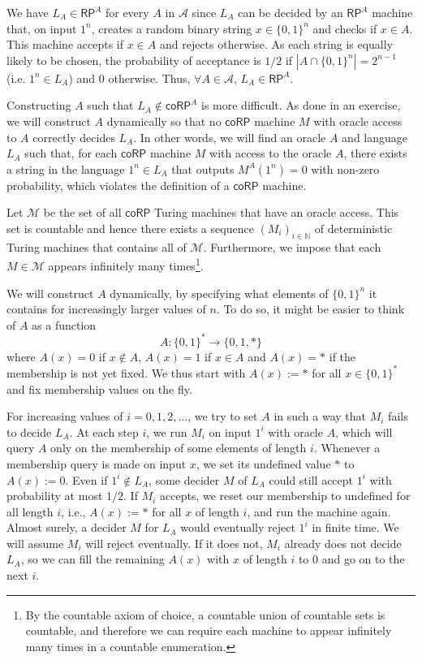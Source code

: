 \documentclass{article}
\begin{document}
We have $L_A \in \mathsf{RP}^A$ for every $A$ in $\mathcal{A}$ since $L_A$ can be decided by an $\mathsf{RP}^A$ machine that, on input $1^n$, creates a random binary string $x \in \{0, 1\}^n$ and checks if $x \in A$. This machine accepts if $x \in A$ and rejects otherwise. As each string is equally likely to be chosen, the probability of acceptance is $1/2$ if $|A \cap \{0, 1\}^n| = 2^{n-1}$ (i.e. $1^n \in L_A$) and $0$ otherwise.
Thus, $\forall A \in \mathcal{A}$, $L_A \in \mathsf{RP}^A$.

Constructing $A$ such that $L_A \notin \mathsf{coRP}^A$ is more difficult. As done in an exercise, we will construct $A$ dynamically so that no $\mathsf{coRP}$ machine $M$ with oracle access to $A$ correctly decides $L_A$. In other words, we will find an oracle $A$ and language $L_A$ such that, for each $\mathsf{coRP}$ machine $M$ with access to the oracle $A$, there exists a string in the language $1^n \in L_A$ that outputs $M^A(1^n) = 0$ with non-zero probability, which violates the definition of a $\mathsf{coRP}$ machine.

Let $\mathcal{M}$ be the set of all $\mathsf{coRP}$ Turing machines that have an oracle access. This set is countable and hence there exists a sequence $(M_i)_{i \in \mathbb{N}}$ of deterministic Turing machines that contains all of $\mathcal{M}$. Furthermore, we impose that each $M \in \mathcal{M}$ appears infinitely many times\footnote{By the countable axiom of choice, a countable union of countable sets is countable, and therefore we can require each machine to appear infinitely many times in a countable enumeration.}.

We will construct $A$ dynamically, by specifying what elements of $\{0, 1\}^n$ it contains for increasingly larger values of $n$. To do so, it might be easier to think of $A$ as a function
\[
	A : \{0, 1\}^* \to \{0, 1, *\}
\]
where $A(x) = 0$ if $x \notin A$, $A(x) = 1$ if $x \in A$ and $A(x) = *$ if the membership is not yet fixed. We thus start with $A(x) := *$ for all $x \in \{0, 1\}^*$ and fix membership values on the fly.

For increasing values of $i = 0, 1, 2, \ldots$, we try to set $A$ in such a way that $M_i$ fails to decide $L_A$. At each step $i$, we run $M_i$ on input $1^i$ with oracle $A$, which will query $A$ only on the membership of some elements of length $i$. Whenever a membership query is made on input $x$, we set its undefined value $*$ to $A(x) := 0$. Even if $1^i \notin L_A$, some decider $M$ of $L_A$ could still accept $1^i$ with probability at most $1/2$. If $M_i$ accepts, we reset our membership to undefined for all length $i$, i.e., $A(x) := *$ for all $x$ of length $i$, and run the machine again. Almost surely, a decider $M$ for $L_A$ would eventually reject $1^i$ in finite time. We will assume $M_i$ will reject eventually. If it does not, $M_i$ already does not decide $L_A$, so we can fill the remaining $A(x)$ with $x$ of length $i$ to $0$ and go on to the next $i$.
\end{document}
